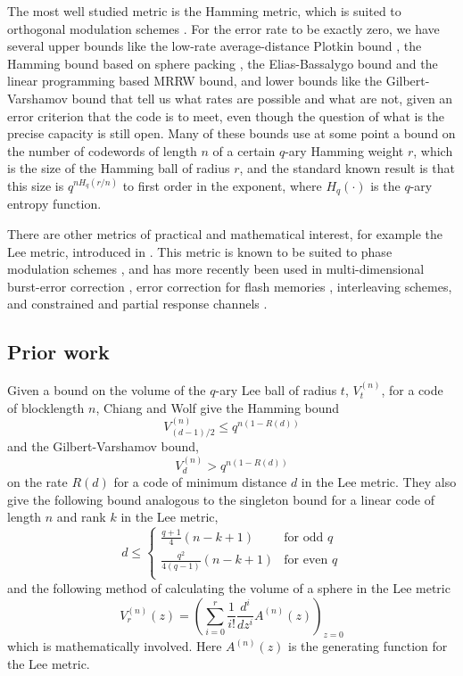\documentclass[conference,letterpaper]{IEEEtran}
\begin{document}
The most well studied metric is the Hamming metric, which is suited to orthogonal modulation schemes \cite{Berlekamp:2015:ACT:2834146}. For the error rate to be exactly zero, we have several upper bounds like the low-rate average-distance Plotkin bound \cite{hamplotkin}, the Hamming bound based on sphere packing \cite{Berlekamp:2015:ACT:2834146}, the Elias-Bassalygo bound\cite{EBbound} and the linear programming based MRRW bound\cite{MRRW}, and lower bounds like the Gilbert-Varshamov bound \cite{gv1}  that tell us what rates are possible and what are not, given an error criterion that the code is to meet, even though the question of what is the precise capacity is still open. Many of these bounds use at some point a bound on the number of codewords of length $n$ of a certain $q$-ary Hamming weight $r$, which is the size of the Hamming ball of radius $r$, and the standard known result is that this size is $q^{nH_q(r/n)}$ to first order in the exponent, where $H_q(\cdot)$ is the $q$-ary entropy function. 

There are other metrics of practical and mathematical interest, for example the Lee metric, introduced in \cite{Lee1958SomePO, ulrich}. This metric is known to be suited to phase modulation schemes \cite{Berlekamp:2015:ACT:2834146}, and has more recently been used in multi-dimensional burst-error correction \cite{bursts}, error correction for flash memories \cite{flash},   interleaving schemes\cite{interleaving}, and constrained and partial response channels \cite{roth-siegel}.

\subsection{Prior work}
Given a bound on the volume of the $q$-ary Lee ball of radius $t$, $V_{t}^{(n)}$, for a code of blocklength $n$, Chiang and Wolf \cite{lee} give the Hamming bound 
\begin{equation}\label{Hamming bound}
    V_{(d-1)/2}^{(n)} \leq q^{n(1-R(d))}
\end{equation}
and the Gilbert-Varshamov bound, 
\begin{equation}\label{GV bound}
    V_{d}^{(n)} > q^{n(1-R(d))}
\end{equation}
on the rate $R(d)$ for a code of minimum distance $d$ in the Lee metric. They also give the following bound analogous to the singleton bound for a linear code of length $n$ and rank $k$ in the Lee metric,
\begin{equation}
    d \leq  
    \begin{cases}
        \frac{q+1}{4}(n-k+1) & \text{for odd $q$}\\
        \frac{q^2}{4(q-1)}(n-k+1) & \text{for even $q$} \\
    \end{cases}
\end{equation}
and the following method of calculating the volume of a sphere in the Lee metric
\begin{equation}
    V_r^{(n)} (z) = \left(\sum_{i = 0}^{r} \frac{1}{i!}\frac{d^i}{dz^i} A^{(n)} (z)\right)_{z = 0}
\end{equation}
which is mathematically involved. Here $A^{(n)} (z)$ is the generating function for the Lee metric.
\end{document}
